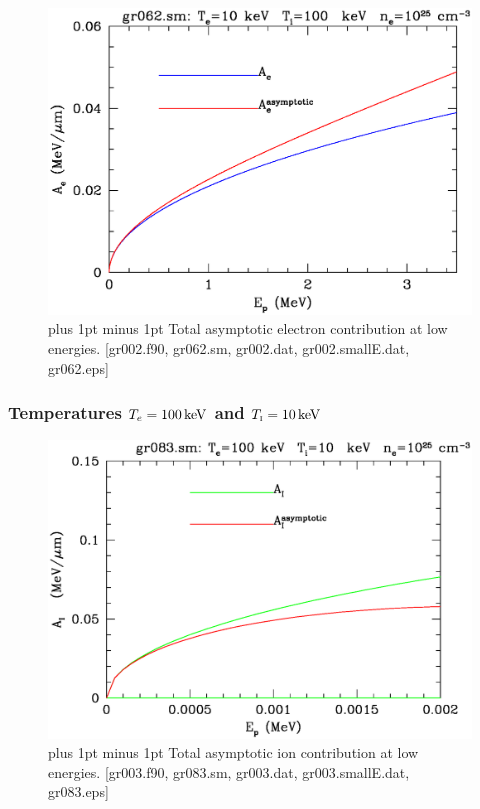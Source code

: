 \documentclass[preprint,12pt,eqsecnum,nofootinbib,amsmath,amssymb]{revtex4}
\newcommand{\smI}{{\rm\scriptscriptstyle I}}
\newcommand{\footnoteskip}{\baselineskip 12pt plus 1pt minus 1pt}
\begin{document}
\vskip-2cm 
\begin{figure}[h!]
\includegraphics[scale=0.45]{gr062.eps} 
\vskip-0.8cm 
\caption{\footnoteskip  
  Total asymptotic electron contribution at low energies. 
 [gr002.f90, gr062.sm, gr002.dat, gr002.smallE.dat, gr062.eps]
}
\label{fig:gr062}
\end{figure}


\pagebreak
\subsubsection{Temperatures $T_e=100\,{\rm keV}$ and $T_\smI=10\,{\rm
    keV}$}

\vskip-2cm 
\begin{figure}[h!]
\includegraphics[scale=0.45]{gr083.eps} 
\vskip-0.8cm 
\caption{\footnoteskip  
  Total asymptotic ion contribution at low energies. 
 [gr003.f90, gr083.sm, gr003.dat, gr003.smallE.dat, gr083.eps]
}
\label{fig:gr083}
\end{figure}
\end{document}
